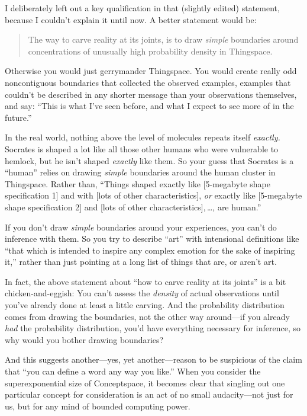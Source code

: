 {{{
 I deliberately left out a key qualification in that (slightly
edited) statement, because I couldn't explain it until
now. A better statement would be:}

\begin{quote}
 The way to carve reality at its joints, is to draw \textit{simple}
boundaries around concentrations of unusually high probability density
in Thingspace.
\end{quote}

{
 Otherwise you would just gerrymander Thing\-space. You would create
really odd noncontiguous boundaries that collected the observed
examples, examples that couldn't be described in any
shorter message than your observations themselves, and say:
``This is what I've seen before, and
what I expect to see more of in the future.''}

{
 In the real world, nothing above the level of molecules repeats
itself \textit{exactly.} Socrates is shaped a lot like all those other
humans who were vulnerable to hemlock, but he isn't
shaped \textit{exactly} like them. So your guess that Socrates is a
``human'' relies on drawing
\textit{simple} boundaries around the human cluster in Thingspace.
Rather than, ``Things shaped exactly like [5-megabyte
shape specification 1] and with [lots of other characteristics],
\textit{or} exactly like [5-megabyte shape specification 2] and [lots
of other characteristics],\,\ldots{}, are human.''}

{
 If you don't draw \textit{simple} boundaries
around your experiences, you can't do inference with
them. So you try to describe ``art''
with intensional definitions like ``that which is
intended to inspire any complex emotion for the sake of inspiring
it,'' rather than just pointing at a long list of
things that are, or aren't art.}

{
 In fact, the above statement about ``how to carve
reality at its joints'' is a bit chicken-and-eggish:
You can't assess the \textit{density} of actual
observations until you've already done at least a
little carving. And the probability distribution comes from drawing the
boundaries, not the other way around---if you already \textit{had} the
probability distribution, you'd have everything
necessary for inference, so why would you bother drawing boundaries?}

{
 And this suggests another---yes, yet another---reason to be
suspicious of the claim that ``you can define a word
any way you like.'' When you consider the
superexponential size of Conceptspace, it becomes clear that singling
out one particular concept for consideration is an act of no small
audacity---not just for us, but for any mind of bounded computing
power.}

}}
